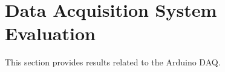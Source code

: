 \section{Data Acquisition System Evaluation}
This section provides results related to the Arduino DAQ.

%         





